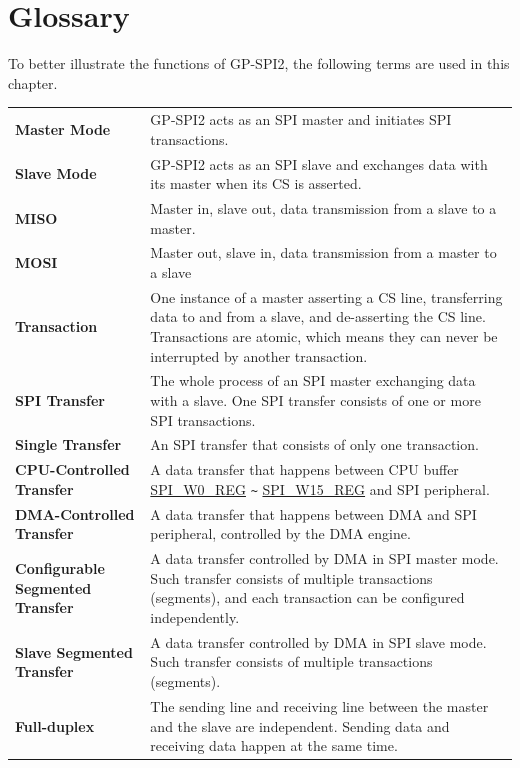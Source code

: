 \section{Glossary}

To better illustrate the functions of GP-SPI2, the following terms are used in this chapter. 

\begin{longtable}[c]{ R{7cm} p{10cm} }

\textbf{Master Mode}     & GP-SPI2 acts as an SPI master and initiates SPI transactions. \\ 
\textbf{Slave Mode}      & GP-SPI2 acts as an SPI slave and exchanges data with its master when its CS is asserted.\\
\textbf{MISO}       & Master in, slave out, data transmission from a slave to a master.\\
\textbf{MOSI}  & Master out, slave in, data transmission from a master to a slave \\ 
\textbf{Transaction} & One instance of a master asserting a CS line, transferring data to and from a slave, and de-asserting the CS line. Transactions are atomic, which means they can never be interrupted by another transaction.\\
\textbf{SPI Transfer} & The whole process of an SPI master exchanging data with a slave. One SPI transfer consists of one or more SPI transactions.\\
\textbf{Single Transfer} & An SPI transfer that consists of only one transaction. \\
\textbf{CPU-Controlled Transfer}& A data transfer that happens between CPU buffer \hyperref[regdesc:SPIW0REG]{SPI\_W0\_REG} \verb+~+ \hyperref[regdesc:SPIW0REG]{SPI\_W15\_REG} and SPI peripheral.\\
\textbf{DMA-Controlled Transfer}& A data transfer that happens between DMA and SPI peripheral, controlled by the DMA engine.\\
\textbf{Configurable Segmented Transfer}& A data transfer controlled by DMA in SPI master mode. Such transfer consists of multiple transactions (segments), and each transaction can be configured independently.\\
\textbf{Slave Segmented Transfer} & A data transfer controlled by DMA in SPI slave mode. Such transfer consists of multiple transactions (segments).\\
\textbf{Full-duplex} & The sending line and receiving line between the master and the slave are independent. Sending data and receiving data happen at the same time. \\

\end{longtable}
